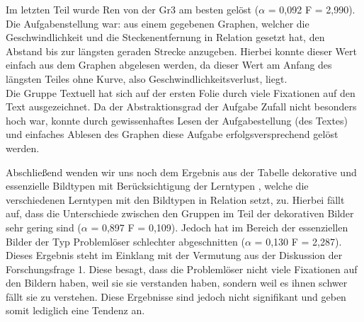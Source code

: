 Im letzten Teil wurde \gls{Ren} von der \gls{Gr3} am besten gelöst ($\alpha$ = 0,092 F = 2,990). Die Aufgabenstellung war: aus einem gegebenen Graphen, welcher die Geschwindlichkeit und die Steckenentfernung in Relation gesetzt hat, den Abstand bis zur längsten geraden Strecke anzugeben. Hierbei konnte dieser Wert einfach aus dem Graphen abgelesen werden, da dieser Wert am Anfang des längsten Teiles ohne Kurve, also Geschwindlichkeitsverlust, liegt. \\
Die Gruppe Textuell hat sich auf der ersten Folie durch viele Fixationen auf den Text ausgezeichnet. Da der Abstraktionsgrad der Aufgabe Zufall nicht besonders hoch war, konnte durch gewissenhaftes Lesen der Aufgabestellung (des Textes) und einfaches Ablesen des Graphen diese Aufgabe erfolgsversprechend gelöst werden. 


Abschließend wenden wir uns noch dem Ergebnis aus der Tabelle \grqq dekorative und essenzielle Bildtypen mit Berücksichtigung der Lerntypen \grqq , welche die verschiedenen Lerntypen mit den Bildtypen in Relation setzt, zu. Hierbei fällt auf, dass die Unterschiede zwischen den Gruppen im Teil der dekorativen Bilder sehr gering sind ($\alpha$ = 0,897 F = 0,109). Jedoch hat im Bereich der essenziellen Bilder der Typ Problemlöser schlechter abgeschnitten ($\alpha$ = 0,130 F = 2,287).
Dieses Ergebnis steht im Einklang mit der Vermutung aus der Diskussion der Forschungsfrage 1. Diese besagt, dass die Problemlöser nicht viele Fixationen auf den Bildern haben, weil sie sie verstanden haben, sondern weil es ihnen schwer fällt sie zu verstehen. Diese Ergebnisse sind jedoch nicht signifikant und geben somit lediglich eine Tendenz an. 
